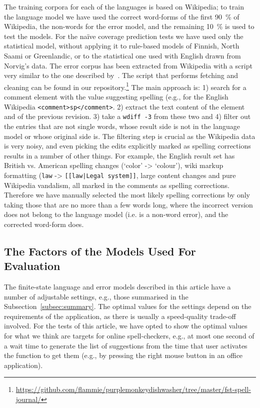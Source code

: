 \documentclass[a4paper,12pt]{article}
\begin{document}
The training corpora for each of the languages is based on Wikipedia; to train
the language model we have used the correct word-forms of the first 90~\% of
Wikipedia, the non-words for the error model, and the remaining 10~\% is used
to test the models. For the naïve coverage prediction tests we have used only
the statistical model, without applying it to rule-based models of Finnish, North
Saami or Greenlandic, or to the statistical one used with English drawn from
Norvig's data. The error corpus has been extracted from Wikipedia
with a script very similar to the one described by~\cite{max2010mining}. The
script that performs fetching and cleaning can be found in our
repository.\footnote{\url{https://github.com/flammie/purplemonkeydishwasher/tree/master/fst-spell-journal/}} The main approach is: 1) search for a comment
element with the value suggesting spelling (e.g., for the English Wikipedia
\texttt{<comment>sp</comment>}. 2) extract the text content of the element and
of the previous revision. 3) take a \texttt{wdiff -3} from these two and 4)
filter out the entries that are not single words, whose result side is not in
the language model or whose original side is. The filtering step is crucial
as the Wikipedia data is very noisy, and even picking the edits explicitly
marked as spelling corrections results in a number of other things. For example, the
English result set has British vs. American spelling changes (`color' ->
`colour'), wiki markup formatting (\texttt{law} -> \texttt{[[law|Legal
system]]}, large content changes and pure Wikipedia vandalism, all marked in
the comments as spelling corrections. Therefore we have manually selected the
most likely spelling corrections by only taking those that are no more than a
few words long, where the incorrect version does not belong to the language
model (i.e. is a non-word error), and the corrected word-form does.

\subsection{The Factors of the Models Used For Evaluation}
\label{subsec:factors}

The finite-state language and error models described in this article have a
number of adjustable settings, e.g., those summarised in the
Subsection~\ref{subsec:summary}. The optimal values for the settings depend on
the requirements of the application, as there is usually a speed-quality
trade-off involved. For the tests of this article, we have opted to show the
optimal values for what we think are targets for online spell-checkers, e.g., at
most one second of a wait time to generate the list of suggestions from the
time that user activates the function to get them (e.g., by pressing the right
mouse button in an office application).
\end{document}
